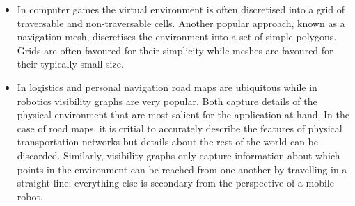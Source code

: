 \begin{itemize}
\item
In computer games the virtual environment is 
often discretised into a grid of traversable and non-traversable cells. Another
popular approach,  known as a navigation mesh, discretises the environment into 
a set of simple polygons. Grids are often favoured for their simplicity while 
meshes are favoured for their typically small size. 
\item In logistics and personal navigation road maps are ubiquitous while 
in robotics visibility graphs are very popular. Both capture details of the physical 
environment that are most salient for the application at hand. In the case of road maps, it is critial
to accurately describe the features of physical transportation networks but details about the rest
of the world can be discarded. Similarly, visibility graphs only capture information
about which points in the environment can be reached from one another by travelling in a straight
line; everything else is secondary from the perspective of a mobile robot.
\end{itemize}
%
